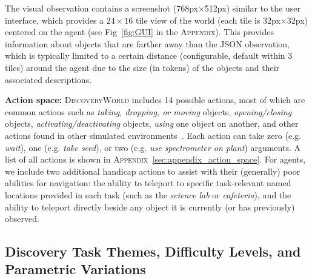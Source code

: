 \documentclass{article}
\newcommand{\env}{\textsc{DiscoveryWorld}\xspace}
\begin{document}
The visual observation contains a screenshot (768px$\times$512px) similar to the user interface, which provides a $24\times16$ tile view of the world (each tile is 32px$\times$32px) centered on the agent (see Fig~\ref{fig:GUI} in the \textsc{Appendix}).  This provides information about objects that are farther away than the \textsc{JSON} observation, which is typically limited to a certain distance (configurable, default within 3 tiles) around the agent due to the size (in tokens) of the objects and their associated descriptions.  

\textbf{Action space:} \env includes 14 possible actions, most of which are common actions such as \textit{taking, dropping, or moving} objects, \textit{opening/closing} objects, \textit{activating/deactivating} objects, \textit{using} one object on another, and other actions found in other simulated environments~\citep{Ct2018TextWorldAL,wang2022scienceworld,Shridhar2020ALFWorldAT}.  Each action can take zero (e.g. \textit{wait}), one (e.g. \textit{take seed}), or two (e.g. \textit{use spectrometer on plant}) arguments.  A list of all actions is shown in \textsc{Appendix}~\ref{sec:appendix_action_space}.  For agents, we include two additional handicap actions to assist with their (generally) poor abilities for navigation: the ability to teleport to specific task-relevant named locations provided in each task (such as the \textit{science lab} or \textit{cafeteria}), and the ability to teleport directly beside any object it is currently (or has previously) observed.

\vspace{-1mm}



\subsection{Discovery Task Themes, Difficulty Levels, and Parametric Variations}
\label{sec:parametric-variations}
\end{document}
